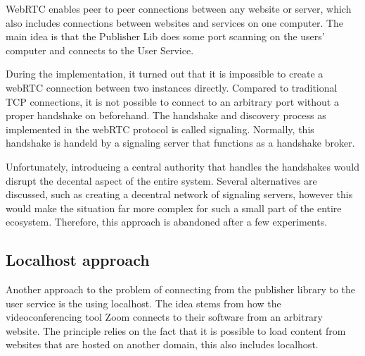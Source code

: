 WebRTC enables peer to peer connections between any website or server, which also includes connections between websites and services on one computer. The main idea is that the Publisher Lib does some port scanning on the users' computer and connects to the User Service.

During the implementation, it turned out that it is impossible to create a webRTC connection between two instances directly. Compared to traditional TCP connections, it is not possible to connect to an arbitrary port without a proper handshake on beforehand. The handshake and discovery process as implemented in the webRTC protocol is called signaling. Normally, this handshake is handeld by a signaling server that functions as a handshake broker.

Unfortunately, introducing a central authority that handles the handshakes would disrupt the decental aspect of the entire system. Several alternatives are discussed, such as creating a decentral network of signaling servers, however this would make the situation far more complex for such a small part of the entire ecosystem. Therefore, this approach is abandoned after a few experiments.

\subsection{Localhost approach}

Another approach to the problem of connecting from the publisher library to the user service is the using localhost. The idea stems from how the videoconferencing tool Zoom connects to their software from an arbitrary website. The principle relies on the fact that it is possible to load content from websites that are hosted on another domain, this also includes localhost.

